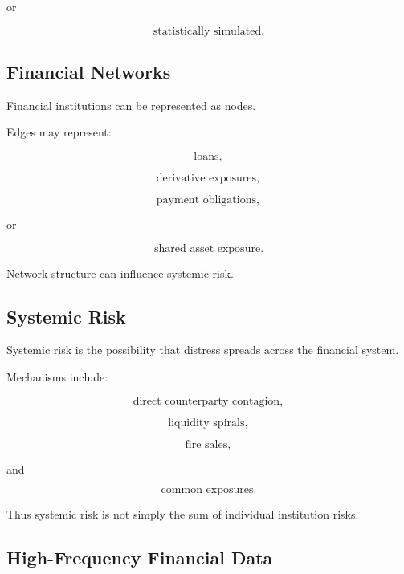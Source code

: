 or

\[
\boxed{
\text{statistically simulated}.
}
\]

\subsection{Financial Networks}
\label{subsec:mathematical-finance-networks}

Financial institutions can be represented as nodes.

Edges may represent:

\[
\boxed{
\text{loans},
}
\]

\[
\boxed{
\text{derivative exposures},
}
\]

\[
\boxed{
\text{payment obligations},
}
\]

or

\[
\boxed{
\text{shared asset exposure}.
}
\]

Network structure can influence systemic risk.

\subsection{Systemic Risk}
\label{subsec:financial-systemic-risk}

Systemic risk is the possibility that distress spreads across the financial
system.

Mechanisms include:

\[
\boxed{
\text{direct counterparty contagion},
}
\]

\[
\boxed{
\text{liquidity spirals},
}
\]

\[
\boxed{
\text{fire sales},
}
\]

and

\[
\boxed{
\text{common exposures}.
}
\]

Thus systemic risk is not simply the sum of individual institution risks.

\subsection{High-Frequency Financial Data}
\label{subsec:high-frequency-finance}


